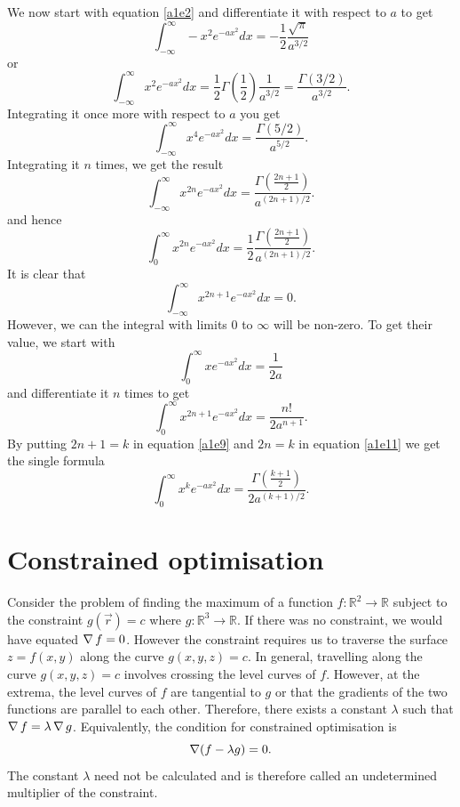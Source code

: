 We now start with equation \eqref{a1e2} and differentiate it with respect to 
$a$ to get
\[
\int_{-\infty}^\infty -x^2e^{-ax^2}dx = -\frac{1}{2}\frac{\sqrt{\pi}}{a^{3/2}}
\]
or
\[
\int_{-\infty}^\infty x^2e^{-ax^2}dx = 
\frac{1}{2}\Gamma\left(\frac{1}{2}\right)\frac{1}{a^{3/2}} = 
\frac{\Gamma(3/2)}{a^{3/2}}.
\]
Integrating it once more with respect to $a$ you get
\[
\int_{-\infty}^\infty x^4e^{-ax^2}dx = \frac{\Gamma(5/2)}{a^{5/2}}.
\]
Integrating it $n$ times, we get the result
\begin{equation}\label{a1e8}
\int_{-\infty}^\infty x^{2n}e^{-ax^2}dx = 
\frac{\Gamma(\frac{2n+1}{2})}{a^{(2n+1)/2}}.
\end{equation}
and hence
\begin{equation}\label{a1e9}
\int_{0}^\infty x^{2n}e^{-ax^2}dx = 
\frac{1}{2}\frac{\Gamma(\frac{2n+1}{2})}{a^{(2n+1)/2}}.
\end{equation}
It is clear that
\begin{equation}\label{a1e10}
\int_{-\infty}^\infty x^{2n+1}e^{-ax^2}dx = 0.
\end{equation}
However, we can the integral with limits $0$ to $\infty$ will be non-zero. To 
get their value, we start with
\[
\int_0^\infty x e^{-ax^2}dx = \frac{1}{2a}
\]
and differentiate it $n$ times to get
\begin{equation}\label{a1e11}
\int_0^\infty x^{2n+1} e^{-ax^2}dx = \frac{n!}{2a^{n+1}}.
\end{equation}
By putting $2n+1=k$ in equation \eqref{a1e9} and $2n=k$ in equation 
\eqref{a1e11} we get the single formula
\begin{equation}\label{a1e12}
\int_0^\infty x^{k} e^{-ax^2}dx = 
\frac{\Gamma\left(\frac{k+1}{2}\right)}{2a^{(k+1)/2}}.
\end{equation}

\section{Constrained optimisation}
Consider the problem of finding the maximum of a function $f:\mathbb{R}^2
\rightarrow \mathbb{R}$ subject to the constraint $g(\vec{r}) = c$ where
$g:\mathbb{R}^3 \rightarrow \mathbb{R}$. If there was no constraint, we
would have equated $\operatorname{\nabla} f = 0$. However the constraint requires us to traverse
the surface $z = f(x, y)$ along the curve $g(x, y, z) = c$. In general, 
travelling along the curve $g(x, y, z) = c$ involves crossing the level curves
of $f$. However, at the extrema, the level curves of $f$ are tangential to $g$
or that the gradients of the two functions are parallel to each other. Therefore,
there exists a constant $\lambda$ such that $\operatorname{\nabla} f = \lambda\operatorname{\nabla} g$. 
Equivalently, the condition for constrained optimisation is
\begin{equation}\label{a2e1}
\operatorname{\nabla} (f - \lambda g) = 0.
\end{equation}
The constant $\lambda$ need not be calculated and is therefore called an
undetermined multiplier of the constraint.
